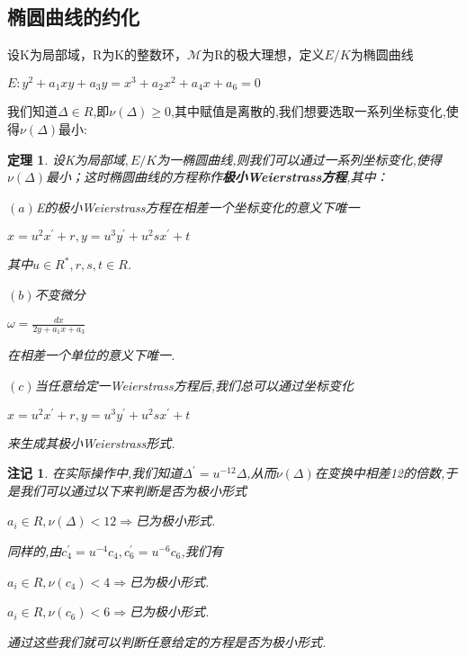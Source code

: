 \documentclass[11pt]{ctexart}
\newtheorem{thm}{定理}[section]
\newtheorem{rem}{注记}[section]
\begin{document}
\subsection{椭圆曲线的约化}
设K为局部域，R为K的整数环，$\mathcal{M}$为R的极大理想，定义$E/K$为椭圆曲线
\begin{center}
    $E:y^2+a_1xy+a_3y=x^3+a_2x^2+a_4x+a_6=0$
\end{center}
我们知道$\Delta \in R$,即$\nu (\Delta)\geq 0$,其中赋值是离散的,我们想要选取一系列坐标变化,使得$\nu (\Delta)$最小:
\begin{thm}设K为局部域$,E/K$为一椭圆曲线,则我们可以通过一系列坐标变化,使得$\nu (\Delta)$最小；这时椭圆曲线的方程称作\textbf{极小Weierstrass方程},其中：

    $(a)$E的极小Weierstrass方程在相差一个坐标变化的意义下唯一
    \begin{center}
        $x=u^2x^{\prime}+r$$,y=u^3y^{\prime}+u^2sx^{\prime}+t$
    \end{center}

    其中$u \in R^{*},r,s,t \in R$.

    $(b)$不变微分
    \begin{center}
        $\omega =\frac{dx}{2y+a_1x+a_3}$
    \end{center}

    在相差一个单位的意义下唯一.

    $(c)$当任意给定一Weierstrass方程后,我们总可以通过坐标变化
    \begin{center}
        $x=u^2x^{\prime}+r$$,y=u^3y^{\prime}+u^2sx^{\prime}+t$
    \end{center}

    来生成其极小Weierstrass形式.
\end{thm}

\begin{rem}在实际操作中,我们知道$\Delta^{\prime}=u^{-12}\Delta  $,从而$\nu (\Delta)$在变换中相差12的倍数,于是我们可以通过以下来判断是否为极小形式
    \begin{center}
        $a_i \in R$$,\nu (\Delta)<12\Longrightarrow $已为极小形式.
    \end{center}
同样的,由$c_4^{\prime}=u^{-4}c_4$$,c_6^{\prime}=u^{-6}c_6$,我们有
    \begin{center}
        $a_i \in R$$,\nu (c_4)<4\Longrightarrow $已为极小形式.

        $a_i \in R$$,\nu (c_6)<6\Longrightarrow $已为极小形式.
    \end{center}
通过这些我们就可以判断任意给定的方程是否为极小形式.
\end{rem}
\end{document}
